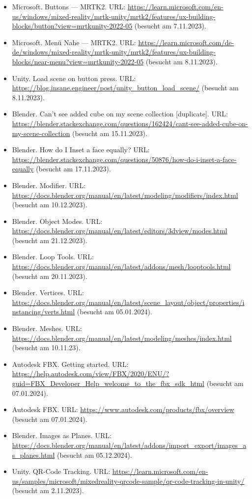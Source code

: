 \begin{itemize}
    \item Microsoft. Buttons — MRTK2. URL: \url{https://learn.microsoft.com/en-us/windows/mixed-reality/mrtk-unity/mrtk2/features/ux-building-blocks/button?view=mrtkunity-2022-05} (besucht am 7.11.2023).
    \item Microsoft. Menü Nahe — MRTK2. URL: \url{https://learn.microsoft.com/de-de/windows/mixed-reality/mrtk-unity/mrtk2/features/ux-building-blocks/near-menu?view=mrtkunity-2022-05} (besucht am 8.11.2023).
    \item Unity. Load scene on button press. URL: \url{https://blog.insane.engineer/post/unity_button_load_scene/} (besucht am 8.11.2023).
    \item Blender. Can't see added cube on my scene collection [duplicate]. URL: \url{https://blender.stackexchange.com/questions/162424/cant-see-added-cube-on-my-scene-collection} (besucht am 15.11.2023).
    \item Blender. How do I Inset a face equally? URL: \url{https://blender.stackexchange.com/questions/50876/how-do-i-inset-a-face-equally} (besucht am 17.11.2023).
    \item Blender. Modifier. URL: \url{https://docs.blender.org/manual/en/latest/modeling/modifiers/index.html} (besucht am 10.12.2023).
    \item Blender. Object Modes. URL: \url{https://docs.blender.org/manual/en/latest/editors/3dview/modes.html} (besucht am 21.12.2023).
    \item Blender. Loop Tools. URL: \url{https://docs.blender.org/manual/en/latest/addons/mesh/looptools.html} (besucht am 20.11.2023).
    \item Blender. Vertices. URL: \url{https://docs.blender.org/manual/en/latest/scene_layout/object/properties/instancing/verts.html} (besucht am 05.01.2024).
    \item Blender. Meshes. URL: \url{https://docs.blender.org/manual/en/latest/modeling/meshes/index.html} (besucht am 10.11.23).
    \item Autodesk FBX. Getting started. URL: \url{https://help.autodesk.com/view/FBX/2020/ENU/?guid=FBX_Developer_Help_welcome_to_the_fbx_sdk_html} (besucht am 07.01.2024).
    \item Autodesk FBX. URL: \url{https://www.autodesk.com/products/fbx/overview} (besucht am 07.01.2024).
    \item Blender. Images as Planes. URL: \url{https://docs.blender.org/manual/en/latest/addons/import_export/images_as_planes.html} (besucht am 05.12.2024).
    \item Unity. QR-Code Tracking. URL: \url{https://learn.microsoft.com/en-us/samples/microsoft/mixedreality-qrcode-sample/qr-code-tracking-in-unity/} (besucht am 2.11.2023).

\end{itemize}
